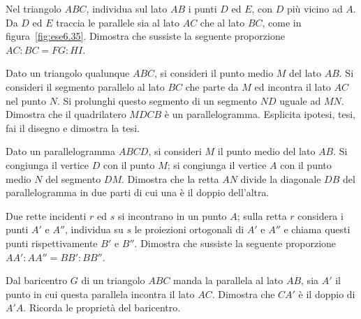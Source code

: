 \begin{multicols}{2}

\begin{esercizio}
\label{ese:6.35}
Nel triangolo $ABC$, individua sul lato $AB$ i punti $D$ ed $E$, con 
$D$ più vicino ad $A$. Da $D$ ed $E$ traccia le parallele sia al lato 
$AC$ che al lato $BC$, come in figura~\ref{fig:ese6.35}. Dimostra che 
sussiste la seguente proporzione $AC:BC=FG:HI$.
\end{esercizio}
\begin{inaccessibleblock}
\begin{center}
\scalebox{.8}{}
\end{center}
\end{inaccessibleblock}

\begin{esercizio}
\label{ese:6.36}
Dato un triangolo qualunque $ABC$, si consideri il punto medio $M$ 
del lato $AB$. Si consideri il segmento parallelo al lato $BC$ che 
parte da $M$ ed incontra il lato $AC$ nel punto $N$. Si prolunghi 
questo segmento di un segmento $ND$ uguale ad $MN$. Dimostra che il 
quadrilatero $MDCB$ è un parallelogramma. Esplicita ipotesi, tesi, 
fai il disegno e dimostra la tesi.
\end{esercizio}

\begin{esercizio}
\label{ese:6.37}
Dato un parallelogramma $ABCD$, si consideri $M$ il punto medio del 
lato $AB$. Si congiunga il vertice $D$ con il punto $M$; si congiunga 
il vertice $A$ con il punto medio $N$ del segmento $DM$. Dimostra che 
la retta $AN$ divide la diagonale $DB$ del parallelogramma in due 
parti di cui una è il doppio dell'altra.
\end{esercizio}

\begin{esercizio}
\label{ese:6.38}
Due rette incidenti $r$ ed $s$ si incontrano in un punto $A$; sulla 
retta $r$ considera i punti $A'$ e $A''$, individua su $s$ le 
proiezioni ortogonali di $A'$ e $A''$ e chiama questi punti 
rispettivamente $B'$ e $B''$. Dimostra che sussiste la seguente 
proporzione $AA' : AA'' = BB' : BB''$.
\end{esercizio}

\begin{esercizio}
\label{ese:6.39}
Dal baricentro $G$ di un triangolo $ABC$ manda la parallela al lato 
$AB$, sia $A'$ il punto in cui questa parallela incontra il lato 
$AC$. Dimostra che $CA'$ è il doppio di $A'A$. Ricorda le proprietà 
del baricentro.
\end{esercizio}


\end{multicols}
